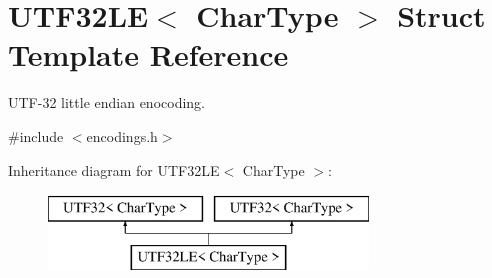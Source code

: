 \hypertarget{struct_u_t_f32_l_e}{}\section{U\+T\+F32\+LE$<$ Char\+Type $>$ Struct Template Reference}
\label{struct_u_t_f32_l_e}


U\+T\+F-\/32 little endian enocoding.  




{\ttfamily \#include $<$encodings.\+h$>$}

Inheritance diagram for U\+T\+F32\+LE$<$ Char\+Type $>$\+:\begin{figure}[H]
\begin{center}
\leavevmode
\includegraphics[height=2.000000cm]{struct_u_t_f32_l_e}
\end{center}
\end{figure}
